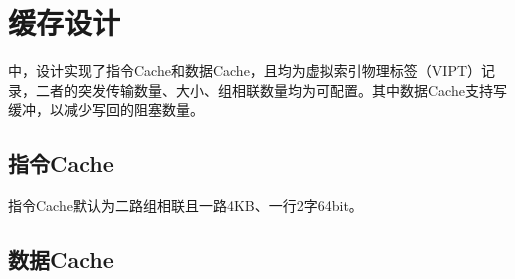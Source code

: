 \section{缓存设计}

\cpuname 中，设计实现了指令Cache和数据Cache，且均为虚拟索引物理标签（VIPT）记录，二者的突发传输数量、大小、组相联数量均为可配置。其中数据Cache支持写缓冲，以减少写回的阻塞数量。

\subsection{指令Cache}
\todo
\cpuname 指令Cache默认为二路组相联且一路4KB、一行2字64bit。


\subsection{数据Cache}

\todo 

